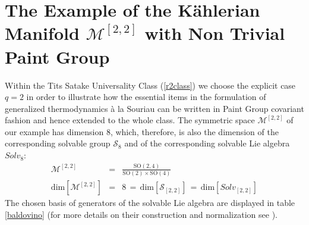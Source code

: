 \documentclass[10pt,a4paper]{article}
\begin{document}
\section{The Example of the K\"ahlerian Manifold $\mathcal{M}^{[2,2]}$ with Non Trivial Paint Group}
\label{belohorizonte}
 Within the Tits Satake Universality Class (\ref{r2class}) we choose the explicit case $q=2$ in order to illustrate how the essential items in the formulation of generalized thermodynamics {\`a} la Souriau can be written in Paint Group covariant fashion and hence extended to the whole class.
 The  symmetric space $\mathcal{M}^{[2,2]}$ of our example has dimension 8, which, therefore, is also the dimension of the corresponding solvable group $\mathcal{S}_8$ and of the corresponding solvable Lie algebra $Solv_8$:
 \begin{eqnarray}\label{laborroto}
 \mathcal{M}^{[2,2]}&=&\frac{\mathrm{SO(2,4)}}{\mathrm{SO(2) \times SO(4)}} \nonumber\\
  \text{dim} \left[\mathcal{M}^{[2,2]}\right]& = & 8 \, = \, \text{dim} [\mathcal{S}_{[2,2]}] \, = \, \text{dim} [Solv_{[2,2]}]
 \end{eqnarray}
 The chosen basis of generators of the solvable Lie algebra are displayed in table \ref{baldovino} (for more details on their construction
 and normalization see \cite{pgtstheory}).
\end{document}
